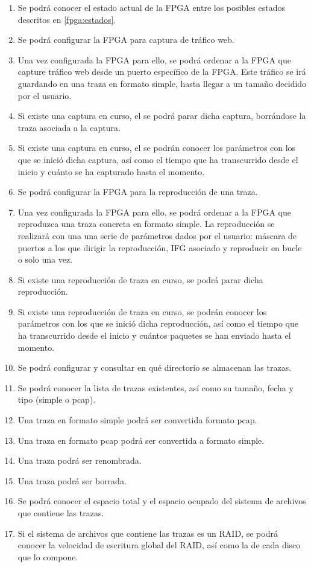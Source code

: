\begin{enumerate}[before=\itshape,font=\normalfont,label=\bfseries RF. \arabic*]
  \setlength{\itemsep}{10pt}
  \setlength{\parskip}{10pt}
  \setlength{\parsep}{10pt}
  \item Se podrá conocer el estado actual de la \gls{FPGA} entre los posibles estados descritos en \ref{fpga:estados}.
  \item Se podrá configurar la \gls{FPGA} para captura de tráfico web.
  \item Una vez configurada la \gls{FPGA} para ello, se podrá ordenar a la \gls{FPGA} que capture tráfico web desde un puerto específico de la \gls{FPGA}. Este tráfico se irá guardando en una \gls{traza} en formato \gls{simple}, hasta llegar a un tamaño decidido por el usuario.
  \item Si existe una captura en curso, el se podrá parar dicha captura, borrándose la \gls{traza} asociada a la captura.
  \item Si existe una captura en curso, el se podrán conocer los parámetros con los que se inició dicha captura, así como el tiempo que ha transcurrido desde el inicio y cuánto se ha capturado hasta el momento.
  \item Se podrá configurar la \gls{FPGA} para la reproducción de una \gls{traza}.
  \item Una vez configurada la \gls{FPGA} para ello, se podrá ordenar a la \gls{FPGA} que reproduzca una \gls{traza} concreta en formato \gls{simple}. La reproducción se realizará con una una serie de parámetros dados por el usuario: máscara de puertos a los que dirigir la reproducción, \gls{IFG} asociado y reproducir en bucle o solo una vez.
  \item Si existe una reproducción de \gls{traza} en curso, se podrá parar dicha reproducción.
  \item Si existe una reproducción de \gls{traza} en curso, se podrán conocer los parámetros con los que se inició dicha reproducción, así como el tiempo que ha transcurrido desde el inicio y cuántos paquetes se han enviado hasta el momento.
  \item Se podrá configurar y consultar en qué directorio se almacenan las \glspl{traza}.
  \item Se podrá conocer la lista de \glspl{traza} existentes, así como su tamaño, fecha y tipo (\gls{simple} o \gls{pcap}).
  \item Una traza en formato \gls{simple} podrá ser convertida formato \gls{pcap}.
  \item Una traza en formato \gls{pcap} podrá ser convertida a formato \gls{simple}.
  \item Una \gls{traza} podrá ser renombrada.
  \item Una \gls{traza} podrá ser borrada.
  \item Se podrá conocer el espacio total y el espacio ocupado del sistema de archivos que contiene las \glspl{traza}.
  \item Si el sistema de archivos que contiene las \glspl{traza} es un \gls{RAID}, se podrá conocer la velocidad de escritura global del \gls{RAID}, así como la de cada disco que lo compone.
\end{enumerate}


